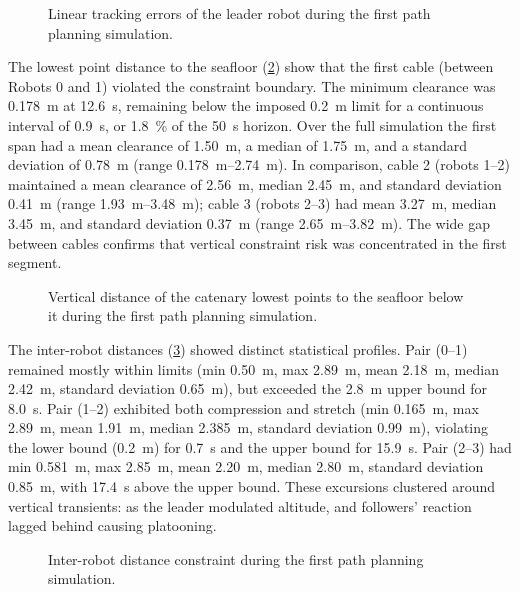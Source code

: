 \begin{figure}
	\centering
	\caption{Linear tracking errors of the leader robot during the first path planning simulation.}
	\label{rcc_s_pp_r_fc_error}
\end{figure}

The lowest point distance to the seafloor (\cref{rcc_s_pp_r_fc_lowest_point}) show that the first
cable (between Robots 0 and 1) violated the constraint boundary. The minimum clearance was
\qty{0.178}{\m} at \qty{12.6}{\s}, remaining below the imposed \qty{0.2}{\m} limit for a continuous
interval of \qty{0.9}{\s}, or \qty{1.8}{\percent} of the \qty{50}{\s} horizon. Over the full
simulation the first span had a mean clearance of \qty{1.50}{\m}, a median of \qty{1.75}{\m}, and a
standard deviation of \qty{0.78}{\m} (range \qtyrange{0.178}{2.74}{\m}). In comparison, cable 2
(robots 1--2) maintained a mean clearance of \qty{2.56}{\m}, median \qty{2.45}{\m}, and standard
deviation \qty{0.41}{\m} (range \qtyrange{1.93}{3.48}{\m}); cable 3 (robots 2--3) had mean
\qty{3.27}{\m}, median \qty{3.45}{\m}, and standard deviation \qty{0.37}{\m} (range
\qtyrange{2.65}{3.82}{\m}). The wide gap between cables confirms that vertical constraint risk was
concentrated in the first segment.

\begin{figure}
	\centering
	\caption{Vertical distance of the catenary lowest points to the seafloor below it during the first path planning simulation.}
	\label{rcc_s_pp_r_fc_lowest_point}
\end{figure}

The inter-robot distances (\cref{rcc_s_pp_r_fc_inter_robot_distance}) showed distinct statistical
profiles. Pair (0--1) remained mostly within limits (min \qty{0.50}{\m}, max \qty{2.89}{\m}, mean
\qty{2.18}{\m}, median \qty{2.42}{\m}, standard deviation \qty{0.65}{\m}), but exceeded the
\qty{2.8}{\m} upper bound for \qty{8.0}{\s}. Pair (1--2) exhibited both compression and stretch
(min \qty{0.165}{\m}, max \qty{2.89}{\m}, mean \qty{1.91}{\m}, median \qty{2.385}{\m}, standard
deviation \qty{0.99}{\m}), violating the lower bound (\qty{0.2}{\m}) for \qty{0.7}{\s} and the
upper bound for \qty{15.9}{\s}. Pair (2--3) had min \qty{0.581}{\m}, max \qty{2.85}{\m}, mean
\qty{2.20}{\m}, median \qty{2.80}{\m}, standard deviation \qty{0.85}{\m}, with \qty{17.4}{\s} above
the upper bound. These excursions clustered around vertical transients: as the leader modulated
altitude, and followers' reaction lagged behind causing platooning.
\begin{figure}
	\centering
	\caption{Inter-robot distance constraint during the first path planning simulation.}
	\label{rcc_s_pp_r_fc_inter_robot_distance}
\end{figure}

